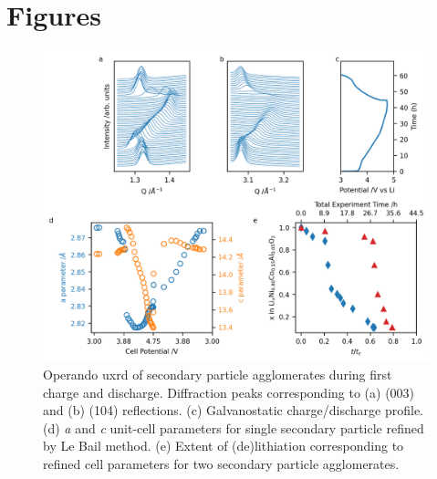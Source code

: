 \documentclass{article}
\begin{document}
\newpage
\section*{Figures}

\begin{figure}[!h]
  \includegraphics[width=\textwidth]{figures/NCA_xrd.png}
  \caption{Operando \gls{uxrd} of \nca{} secondary particle
    agglomerates during first charge and discharge. Diffraction peaks
    corresponding to (a) (003) and (b) (104) reflections. (c)
    Galvanostatic charge/discharge profile. (d) \textit{a} and
    \textit{c} unit-cell parameters for single secondary particle
    refined by Le Bail method. (e) Extent of (de)lithiation
    corresponding to refined cell parameters\cite{robert2015} for two
    secondary particle agglomerates.}
  \label{fig:uxrd}
\end{figure}
\end{document}
